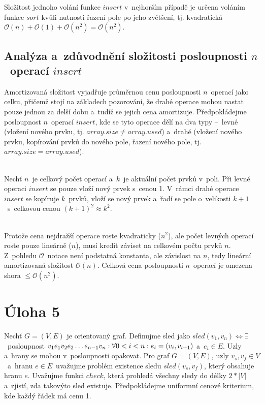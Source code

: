 \documentclass[a4paper, 11pt]{article}
\begin{document}
\noindent Složitost jednoho volání funkce $insert$ v~nejhorším případě je určena voláním funkce $sort$ kvůli nutnosti řazení pole po jeho zvětšení, tj. kvadratická $\mathcal{O}(n) + \mathcal{O}(1) + \mathcal{O}(n^2) = \mathcal{O}(n^2)$.

\subsection*{Analýza a~zdůvodnění složitosti posloupnosti $n$~operací $insert$}

Amortizovaná složitost vyjadřuje průměrnou cenu posloupnosti $n$~operací jako celku, přičemž stojí na základech pozorování, že drahé operace mohou nastat pouze jednou za delší dobu a~tudíž se jejich cena amortizuje.
Předpokládejme posloupnost $n$~operací $insert$, kde se tyto operace dělí na dva typy --~levné (vložení nového prvku, tj. $array.size \neq array.used$) a~drahé (vložení nového prvku, kopírování prvků do nového pole, řazení nového pole, tj. $array.size = array.used$).

\noindent \\ Nechť $n$~je celkový počet operací a~$k$~je aktuální počet prvků v~poli.
Při levné operaci $insert$ se pouze vloží nový prvek s~cenou 1.
V~rámci drahé operace $insert$ se kopíruje $k$~prvků, vloží se nový prvek a~řadí se pole o~velikosti $k + 1$~s~celkovou cenou $(k + 1)^2 \approx k^2$.

\noindent \\ Protože cena nejdražší operace roste kvadraticky ($n^2$), ale počet levných operací roste pouze lineárně ($n$), musí kredit záviset na celkovém počtu prvků $n$.
Z~pohledu $\mathcal{O}$~notace není podstatná konstanta, ale závislost na $n$, tedy lineární amortizovaná složitost $\mathcal{O} (n)$.
Celková cena posloupnosti $n$~operací je omezena shora $\leq \mathcal{O} (n^2)$.

\newpage

\section*{Úloha 5}

Nechť $G = (V, E)$ je orientovaný graf.
Definujme sled jako $sled (v_1, v_n) \Leftrightarrow \exists$~posloupnost $v_1 e_1 v_2 e_2 \dots\\e_{n - 1} v_n : \forall 0 < i < n : e_i = (v_i, v_{i + 1})$ a~$e_i \in E$.
Uzly a~hrany se mohou v~posloupnosti opakovat.
Pro graf $G = (V, E)$, uzly $v_s, v_f \in V$~a~hranu $e \in E$~uvažujme problém existence sledu $sled (v_s, v_f)$, který obsahuje hranu $e$.
Uvažujme funkci $check$, která prohledá všechny sledy do délky $2 \ast |V|$ a~zjistí, zda takovýto sled existuje.
Předpokládejme uniformní cenové kriterium, kde každý řádek má cenu 1.
\end{document}
